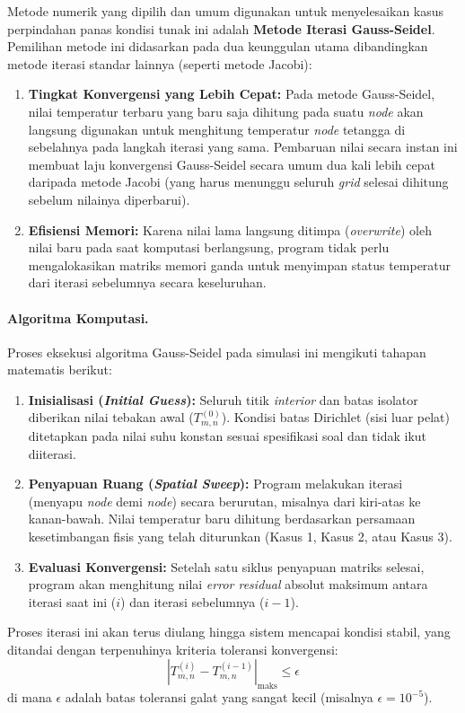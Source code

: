 \documentclass[12pt,a4paper]{article}
\begin{document}
Metode numerik yang dipilih dan umum digunakan untuk menyelesaikan kasus perpindahan panas kondisi tunak ini adalah \textbf{Metode Iterasi Gauss-Seidel}. Pemilihan metode ini didasarkan pada dua keunggulan utama dibandingkan metode iterasi standar lainnya (seperti metode Jacobi):
\begin{enumerate}
    \item \textbf{Tingkat Konvergensi yang Lebih Cepat:} Pada metode Gauss-Seidel, nilai temperatur terbaru yang baru saja dihitung pada suatu \textit{node} akan langsung digunakan untuk menghitung temperatur \textit{node} tetangga di sebelahnya pada langkah iterasi yang sama. Pembaruan nilai secara instan ini membuat laju konvergensi Gauss-Seidel secara umum dua kali lebih cepat daripada metode Jacobi (yang harus menunggu seluruh \textit{grid} selesai dihitung sebelum nilainya diperbarui).
    \item \textbf{Efisiensi Memori:} Karena nilai lama langsung ditimpa (\textit{overwrite}) oleh nilai baru pada saat komputasi berlangsung, program tidak perlu mengalokasikan matriks memori ganda untuk menyimpan status temperatur dari iterasi sebelumnya secara keseluruhan.
\end{enumerate}

\paragraph{Algoritma Komputasi.} 
Proses eksekusi algoritma Gauss-Seidel pada simulasi ini mengikuti tahapan matematis berikut:
\begin{enumerate}
    \item \textbf{Inisialisasi (\textit{Initial Guess}):} Seluruh titik \textit{interior} dan batas isolator diberikan nilai tebakan awal ($T_{m,n}^{(0)}$). Kondisi batas Dirichlet (sisi luar pelat) ditetapkan pada nilai suhu konstan sesuai spesifikasi soal dan tidak ikut diiterasi.
    \item \textbf{Penyapuan Ruang (\textit{Spatial Sweep}):} Program melakukan iterasi (menyapu \textit{node} demi \textit{node}) secara berurutan, misalnya dari kiri-atas ke kanan-bawah. Nilai temperatur baru dihitung berdasarkan persamaan kesetimbangan fisis yang telah diturunkan (Kasus 1, Kasus 2, atau Kasus 3).
    \item \textbf{Evaluasi Konvergensi:} Setelah satu siklus penyapuan matriks selesai, program akan menghitung nilai \textit{error residual} absolut maksimum antara iterasi saat ini ($i$) dan iterasi sebelumnya ($i-1$).
\end{enumerate}
Proses iterasi ini akan terus diulang hingga sistem mencapai kondisi stabil, yang ditandai dengan terpenuhinya kriteria toleransi konvergensi:
\begin{equation}
    |T_{m,n}^{(i)} - T_{m,n}^{(i-1)}|_{\text{maks}} \leq \epsilon
\end{equation}
di mana $\epsilon$ adalah batas toleransi galat yang sangat kecil (misalnya $\epsilon = 10^{-5}$).
\end{document}
